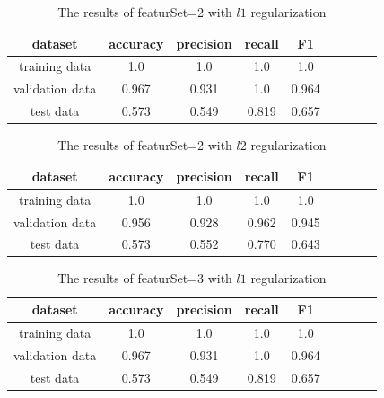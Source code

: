 \begin{table}[htb]
  \begin{center}
  \begin{tabular}{|c|c|c|c|c|c|c|c|c|} \hline
    dataset & accuracy & precision & recall & F1 \\ \hline
    training data & 1.0 & 1.0 & 1.0 & 1.0 \\ \hline
    validation data & 0.967 & 0.931 & 1.0 & 0.964 \\ \hline
    test data & 0.573 & 0.549 & 0.819 & 0.657 \\ \hline
  \end{tabular}
  \caption{The results of featurSet=2 with $l1$ regularization}
  \label{tab:result_2_l1}
  \end{center}
\end{table}

\begin{table}[htb]
  \begin{center}
  \begin{tabular}{|c|c|c|c|c|c|c|c|c|} \hline
    dataset & accuracy & precision & recall & F1 \\ \hline
    training data & 1.0 & 1.0 & 1.0 & 1.0 \\ \hline
    validation data & 0.956 & 0.928 & 0.962 & 0.945 \\ \hline
    test data & 0.573 & 0.552 & 0.770 & 0.643 \\ \hline
  \end{tabular}
  \caption{The results of featurSet=2 with $l2$ regularization}
  \label{tab:result_2_l2}
  \end{center}
\end{table}

\begin{table}[htb]
  \begin{center}
  \begin{tabular}{|c|c|c|c|c|c|c|c|c|} \hline
    dataset & accuracy & precision & recall & F1 \\ \hline
    training data & 1.0 & 1.0 & 1.0 & 1.0 \\ \hline
    validation data & 0.967 & 0.931 & 1.0 & 0.964 \\ \hline
    test data & 0.573 & 0.549 & 0.819 & 0.657 \\ \hline
  \end{tabular}
  \caption{The results of featurSet=3 with $l1$ regularization}
  \label{tab:result_3_l1}
  \end{center}
\end{table}

